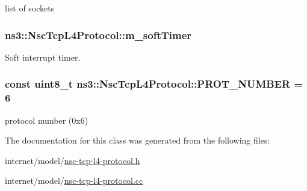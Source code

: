 list of sockets 

\subsubsection[{\texorpdfstring{m\+\_\+soft\+Timer}{m_softTimer}}]{ ns3\+::\+Nsc\+Tcp\+L4\+Protocol\+::m\+\_\+soft\+Timer\hspace{0.3cm}{\ttfamily [private]}}\hypertarget{classns3_1_1NscTcpL4Protocol_a0f73a0972ef238971e9d544e87b3510a}{}\label{classns3_1_1NscTcpL4Protocol_a0f73a0972ef238971e9d544e87b3510a}


Soft interrupt timer. 

\subsubsection[{\texorpdfstring{P\+R\+O\+T\+\_\+\+N\+U\+M\+B\+ER}{PROT_NUMBER}}]{\setlength{\rightskip}{0pt plus 5cm}const uint8\+\_\+t ns3\+::\+Nsc\+Tcp\+L4\+Protocol\+::\+P\+R\+O\+T\+\_\+\+N\+U\+M\+B\+ER = 6\hspace{0.3cm}{\ttfamily [static]}}\hypertarget{classns3_1_1NscTcpL4Protocol_afad61be589382ee316540dfa856d6f5b}{}\label{classns3_1_1NscTcpL4Protocol_afad61be589382ee316540dfa856d6f5b}


protocol number (0x6) 



The documentation for this class was generated from the following files\+:\begin{DoxyCompactItemize}
\item 
internet/model/\hyperlink{nsc-tcp-l4-protocol_8h}{nsc-\/tcp-\/l4-\/protocol.\+h}\item 
internet/model/\hyperlink{nsc-tcp-l4-protocol_8cc}{nsc-\/tcp-\/l4-\/protocol.\+cc}\end{DoxyCompactItemize}
